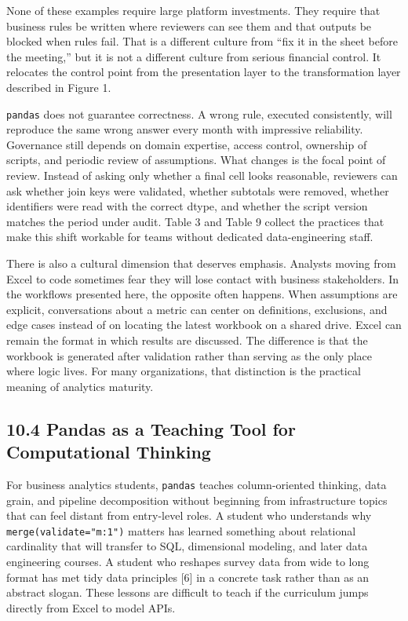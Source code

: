 \documentclass[
  12pt,
]{article}
\begin{document}
None of these examples require large platform investments. They require
that business rules be written where reviewers can see them and that
outputs be blocked when rules fail. That is a different culture from
``fix it in the sheet before the meeting,'' but it is not a different
culture from serious financial control. It relocates the control point
from the presentation layer to the transformation layer described in
Figure 1.

\texttt{pandas} does not guarantee correctness. A wrong rule, executed
consistently, will reproduce the same wrong answer every month with
impressive reliability. Governance still depends on domain expertise,
access control, ownership of scripts, and periodic review of
assumptions. What changes is the focal point of review. Instead of
asking only whether a final cell looks reasonable, reviewers can ask
whether join keys were validated, whether subtotals were removed,
whether identifiers were read with the correct dtype, and whether the
script version matches the period under audit. Table 3 and Table 9
collect the practices that make this shift workable for teams without
dedicated data-engineering staff.

There is also a cultural dimension that deserves emphasis. Analysts
moving from Excel to code sometimes fear they will lose contact with
business stakeholders. In the workflows presented here, the opposite
often happens. When assumptions are explicit, conversations about a
metric can center on definitions, exclusions, and edge cases instead of
on locating the latest workbook on a shared drive. Excel can remain the
format in which results are discussed. The difference is that the
workbook is generated after validation rather than serving as the only
place where logic lives. For many organizations, that distinction is the
practical meaning of analytics maturity.

\subsection{10.4 Pandas as a Teaching Tool for Computational
Thinking}\label{pandas-as-a-teaching-tool-for-computational-thinking}

For business analytics students, \texttt{pandas} teaches column-oriented
thinking, data grain, and pipeline decomposition without beginning from
infrastructure topics that can feel distant from entry-level roles. A
student who understands why \texttt{merge(validate="m:1")} matters has
learned something about relational cardinality that will transfer to
SQL, dimensional modeling, and later data engineering courses. A student
who reshapes survey data from wide to long format has met tidy data
principles {[}6{]} in a concrete task rather than as an abstract slogan.
These lessons are difficult to teach if the curriculum jumps directly
from Excel to model APIs.
\end{document}
